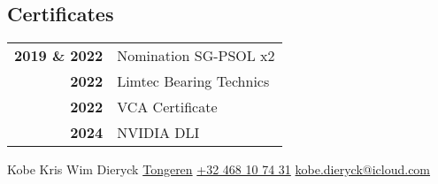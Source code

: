 \documentclass[lighthipster]{simplehipstercv}
\newlength{\rightcolwidth}
\begin{document}
\begin{paracol}{2}
{\begin{minipage}[t]{0.3\textwidth}
\section*{Certificates}
\begin{tabular}{>{\footnotesize\bfseries}r >{\footnotesize}p{}}
    2019 \& 2022 & Nomination SG-PSOL x2 \\
    2022 & Limtec Bearing Technics \\
    2022 & VCA Certificate\\
    2024 & NVIDIA DLI
\end{tabular}
\bigskip
\end{minipage}



\vspace{1em}
\vfill{} %

\setlength{\parindent}{0pt}
\begin{minipage}[t]{\rightcolwidth}
\begin{center}\fontfamily{\sfdefault}\selectfont \color{black!70}
{\small Kobe Kris Wim Dieryck  \href{https://maps.app.goo.gl/CwT1sixW7RU7vn4p6}{Tongeren}  \href{tel:+32468107431}{+32 468 10 74 31}  \protect\href{mailto:kobe.dieryck@icloud.com}{kobe.dieryck@icloud.com}\newline
}
\end{center}
\end{minipage}
}
\end{paracol}
\end{document}
